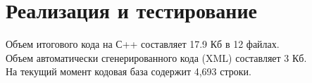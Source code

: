 \section{Реализация и тестирование}
Объем итогового кода на С++ составляет 17.9 Кб в 12 файлах.\\
Объем автоматически сгенерированного кода (XML) составляет 3 Кб.\\
На текущий момент кодовая база содержит 4,693 строки.

